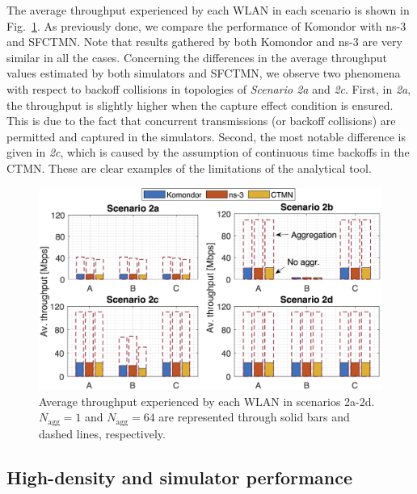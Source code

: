 \documentclass{article}
\begin{document}
	The average throughput experienced by each WLAN in each scenario is shown in Fig.~\ref{fig:results_complex_scenarios}. As previously done, we compare the performance of Komondor with ns-3 and SFCTMN. Note that results gathered by both Komondor and ns-3 are very similar in all the cases. Concerning the differences in the average throughput values estimated by both simulators and SFCTMN, we observe two phenomena with respect to backoff collisions in topologies of \textit{Scenario 2a} and \textit{2c}. First, in \textit{2a}, the throughput is slightly higher when the capture effect condition is ensured. This is due to the fact that concurrent transmissions (or backoff collisions) are permitted and captured in the simulators. Second, the most notable difference is given in \textit{2c}, which is caused by the assumption of continuous time backoffs in the CTMN. These are clear examples of the limitations of the analytical tool.
	
	\begin{figure}[t]
		\centering	
		\includegraphics[width=.8\columnwidth]{results_scenario_2.png}
		\caption{Average throughput experienced by each WLAN in scenarios 2a-2d. $N_{\text{agg}} = 1$ and $N_{\text{agg}}=64$ are represented through solid bars and dashed lines, respectively.}
		\label{fig:results_complex_scenarios}
	\end{figure}
	
	\subsection{High-density and simulator performance}
	
\end{document}
